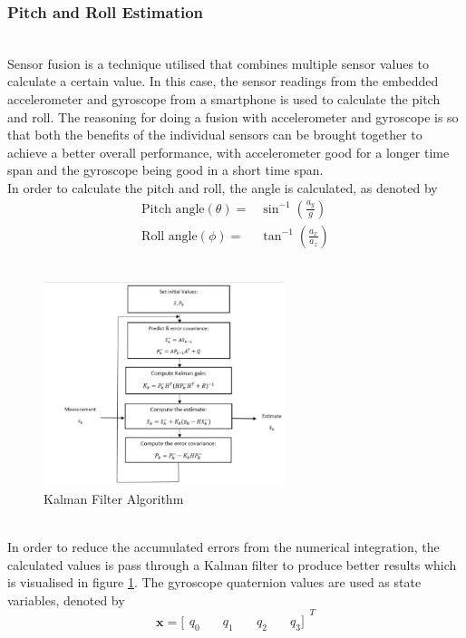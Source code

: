 \documentclass{l4proj}
\begin{document}
\subsubsection{Pitch and Roll Estimation}~\\
Sensor fusion is a technique utilised that combines multiple sensor values to calculate a certain value. In this case, the sensor readings from the embedded accelerometer and gyroscope from a smartphone is used to calculate the pitch and roll. The reasoning for doing a fusion with accelerometer and gyroscope is so that both the benefits of the individual sensors can be brought together to achieve a better overall performance, with accelerometer good for a longer time span and the gyroscope being good in a short time span.\\
In order to calculate the pitch and roll, the angle is calculated, as denoted by
\begin{align*} \textrm {Pitch angle}(\theta)=&{\sin ^{ - 1}}\left ({{\frac {a_{y}}{g}} }\right) \tag{7}\\ \textrm {Roll angle}(\phi)=&{\tan ^{ - 1}}\left ({{\frac {a_{x}}{a_{z}}} }\right)\tag{8}\end{align*}\\
\begin{figure}[h]
    \centering
    \includegraphics[width=70mm]{images/kalman}
    \caption{Kalman Filter Algorithm}
    \label{fig:kalman1}
\end{figure}\cite{kalmanalgo}\\
In order to reduce the accumulated errors from the numerical integration, the calculated values is pass through a Kalman filter\cite{kalmanfilter} to produce better results which is visualised in figure \ref{fig:kalman1}. The gyroscope quaternion values are used as state variables, denoted by 
\begin{equation*} \boldsymbol {x} = \big[{\begin{array}{*{20}{c}} {q_{0}}&\quad {q_{1}}&\quad {q_{2}}&\quad {q_{3}}\big] \end{array}^{T}}\tag{9}\end{equation*}\\
\end{document}
